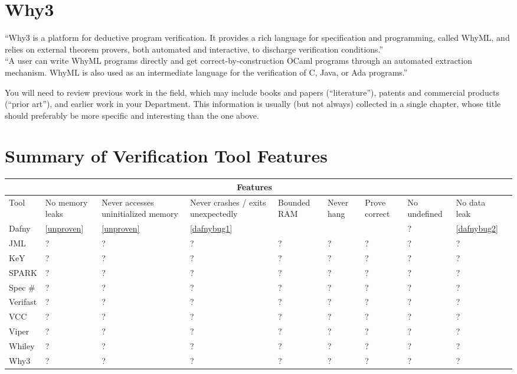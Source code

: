 \documentclass[12pt,openany,a4paper]{book}
\begin{document}
\section {Why3}
``Why3 is a platform for deductive program verification. It provides a rich language for
specification and programming, called WhyML, and relies on external theorem provers,
both automated and interactive, to discharge verification conditions.''\\
``A user can write WhyML programs directly and get correct-by-construction
OCaml programs through an automated extraction mechanism. WhyML is also used as
an intermediate language for the verification of C, Java, or Ada programs.''



You will need to review previous work in the field, which may include
books and papers (``literature''), patents and commercial products
(``prior art''), and earlier work in your Department.  This
information is usually (but not always) collected in a single chapter,
whose title should preferably be more specific and interesting than
the one above.

\section{Summary of Verification Tool Features}

\begin{tabular}{ |p{1.3cm}||p{1.5cm}|p{1.5cm}|p{1.5cm}| p{1.5cm}|p{1.5cm}|p{1.5cm}|p{1cm}|p{1cm}| p{1cm}| }
 \hline
 \multicolumn{9}{|c|}{Features} \\
 \hline
Tool & 
No memory leaks & 
Never accesses uninitialized memory & 
Never crashes / exits unexpectedly &
Bounded
RAM &
Never hang &
Prove correct &
No undefined &
No data leak 
\\
 \hline
Dafny 		& \cellcolor{red} \ref{unproven} & \cellcolor{red} \ref{unproven} & \cellcolor{red} \ref{dafnybug1} & \cellcolor{red} & \cellcolor{green} & \cellcolor{green} & ? & \cellcolor{red} \ref{dafnybug2} \\
 \hline
JML   		& ? & ? & ?& ?& ?& ?& ?& ?\\
 \hline
KeY 		& ? & ? & ?& ?& ?& ?& ?& ?\\
 \hline
SPARK		& ? & ? & ?& ?& ?& ?& ?& ?\\
 \hline
Spec \#		& ? & ? & ?& ?& ?& ?& ?& ?\\
 \hline
Verifast& ? & ? & ?& ?& ?& ?& ?& ?\\
 \hline
VCC& ? & ? & ?& ?& ?& ?& ?& ?\\
 \hline
Viper& ? & ? & ?& ?& ?& ?& ?& ?\\
 \hline
Whiley& ? & ? & ?& ?& ?& ?& ?& ?\\
 \hline
Why3& ? & ? & ?& ?& ?& ?& ?& ?\\
 \hline
\end{tabular}
\end{document}
